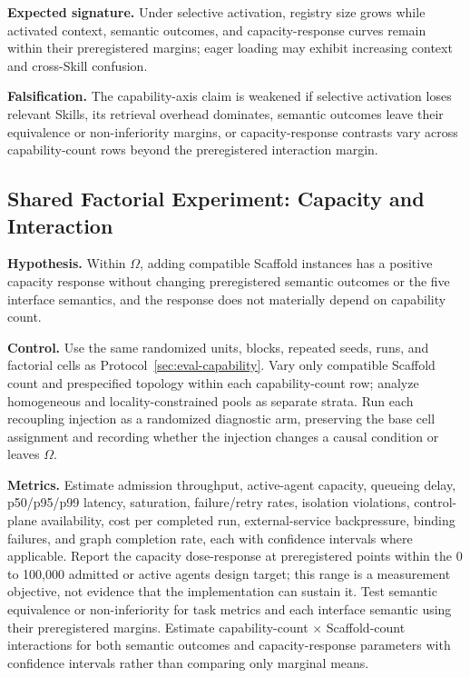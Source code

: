 \textbf{Expected signature.} Under selective activation, registry size grows while activated context, semantic outcomes, and capacity-response curves remain within their preregistered margins; eager loading may exhibit increasing context and cross-Skill confusion.

\textbf{Falsification.} The capability-axis claim is weakened if selective activation loses relevant Skills, its retrieval overhead dominates, semantic outcomes leave their equivalence or non-inferiority margins, or capacity-response contrasts vary across capability-count rows beyond the preregistered interaction margin.

\subsection{Shared Factorial Experiment: Capacity and Interaction}
\label{sec:eval-capacity}

\textbf{Hypothesis.} Within $\Omega$, adding compatible Scaffold instances has a positive capacity response without changing preregistered semantic outcomes or the five interface semantics, and the response does not materially depend on capability count.

\textbf{Control.} Use the same randomized units, blocks, repeated seeds, runs, and factorial cells as Protocol~\ref{sec:eval-capability}. Vary only compatible Scaffold count and prespecified topology within each capability-count row; analyze homogeneous and locality-constrained pools as separate strata. Run each recoupling injection as a randomized diagnostic arm, preserving the base cell assignment and recording whether the injection changes a causal condition or leaves $\Omega$.

\textbf{Metrics.} Estimate admission throughput, active-agent capacity, queueing delay, p50/p95/p99 latency, saturation, failure/retry rates, isolation violations, control-plane availability, cost per completed run, external-service backpressure, binding failures, and graph completion rate, each with confidence intervals where applicable. Report the capacity dose-response at preregistered points within the 0 to 100{,}000 admitted or active agents design target; this range is a measurement objective, not evidence that the implementation can sustain it. Test semantic equivalence or non-inferiority for task metrics and each interface semantic using their preregistered margins. Estimate capability-count $\times$ Scaffold-count interactions for both semantic outcomes and capacity-response parameters with confidence intervals rather than comparing only marginal means.

